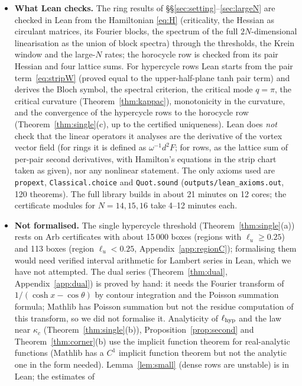 \documentclass[11pt]{article}
\theoremstyle{definition}
\theoremstyle{remark}
\begin{document}
\begin{itemize}
\item \textbf{What Lean checks.} The ring results of \S\S\ref{sec:setting}--\ref{sec:largeN} are checked in Lean from the Hamiltonian
\eqref{eq:H} (criticality, the Hessian as circulant matrices, its Fourier blocks, the spectrum of the full $2N$-dimensional linearisation as
the union of block spectra) through the thresholds, the Krein window and the large-$N$ rates; the horocycle row is checked from its pair
Hessian and four lattice sums. For hypercycle rows Lean starts from the pair term~\eqref{eq:stripW} (proved equal to the
upper-half-plane tanh pair term) and derives the Bloch symbol, the spectral criterion, the critical mode $q=\pi$, the critical
curvature (Theorem~\ref{thm:kappac}), monotonicity in the curvature, and the convergence of the hypercycle rows to the horocycle row
(Theorem~\ref{thm:single}(c), up to the certified uniqueness). Lean does \emph{not} check that the linear operators it analyses are the
derivative of the vortex vector field (for rings it is defined as $\omega^{-1}d^2F$; for rows, as the lattice sum of per-pair second
derivatives, with Hamilton's equations in the strip chart taken as given), nor any nonlinear statement. The only axioms used are
\texttt{propext}, \texttt{Classical.choice} and \texttt{Quot.sound} (\texttt{outputs/lean\_axioms.out}, 120 theorems). The full library
builds in about 21 minutes on 12 cores; the certificate modules for $N=14,15,16$ take 4--12 minutes each.
\item \textbf{Not formalised.} The single hypercycle threshold (Theorem~\ref{thm:single}(a)) rests on Arb certificates with about
15\,000 boxes (regions with $\ell_u\ge0.25$) and 113 boxes (region $\ell_u<0.25$, Appendix~\ref{app:regionC}); formalising them would
need verified interval arithmetic for Lambert series in Lean, which we have not attempted. The dual series (Theorem~\ref{thm:dual},
Appendix~\ref{app:dual}) is proved by hand: it needs the Fourier transform of $1/(\cosh x-\cos\theta)$ by contour integration and the
Poisson summation formula; Mathlib has Poisson summation but not the residue computation of this transform, so we did not formalise
it. Analyticity of $\ell_{\rm hyp}$ and the law near $\kappa_c$ (Theorem~\ref{thm:single}(b)), Proposition~\ref{prop:second} and
Theorem~\ref{thm:corner}(b) use the implicit function theorem for real-analytic functions (Mathlib has a $C^1$ implicit function
theorem but not the analytic one in the form needed). Lemma~\ref{lem:small} (dense rows are unstable) is in Lean; the estimates of

\end{itemize}
\end{document}
